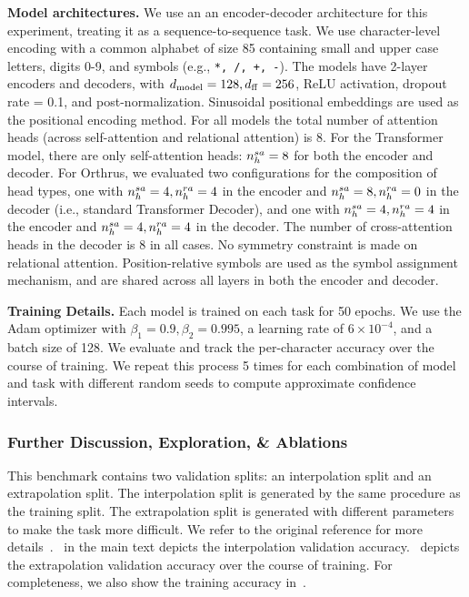 \textbf{Model architectures.} We use an an encoder-decoder architecture for this experiment, treating it as a sequence-to-sequence task. We use character-level encoding with a common alphabet of size 85 containing small and upper case letters, digits 0-9, and symbols (e.g., \texttt{*, /, +, -}). The models have 2-layer encoders and decoders, with $d_{\mathrm{model}} = 128, d_{\mathrm{ff}} = 256$, ReLU activation, dropout rate = 0.1, and post-normalization. Sinusoidal positional embeddings are used as the positional encoding method. For all models the total number of attention heads (across self-attention and relational attention) is $8$. For the Transformer model, there are only self-attention heads: $n_h^{sa} = 8$ for both the encoder and decoder. For Orthrus, we evaluated two configurations for the composition of head types, one with $n_h^{sa} = 4, n_h^{ra} = 4$ in the encoder and $n_h^{sa} = 8, n_h^{ra} = 0$ in the decoder (i.e., standard Transformer Decoder), and one with $n_h^{sa} = 4, n_h^{ra} = 4$ in the encoder and $n_h^{sa} = 4, n_h^{ra} = 4$ in the decoder. The number of cross-attention heads in the decoder is $8$ in all cases. No symmetry constraint is made on relational attention. Position-relative symbols are used as the symbol assignment mechanism, and are shared across all layers in both the encoder and decoder.

\textbf{Training Details.} Each model is trained on each task for 50 epochs. We use the Adam optimizer with $\beta_1 = 0.9, \beta_2 = 0.995$, a learning rate of $6 \times 10^{-4}$, and a batch size of 128. We evaluate and track the per-character accuracy over the course of training. We repeat this process 5 times for each combination of model and task with different random seeds to compute approximate confidence intervals.

\subsubsection*{Further Discussion, Exploration, \& Ablations}

This benchmark contains two validation splits: an interpolation split and an extrapolation split. The interpolation split is generated by the same procedure as the training split. The extrapolation split is generated with different parameters to make the task more difficult. We refer to the original reference for more details~\citep{saxtonAnalyzingMathematicalReasoning2019}.~ in the main text depicts the interpolation validation accuracy.~ depicts the extrapolation validation accuracy over the course of training. For completeness, we also show the training accuracy in~.


